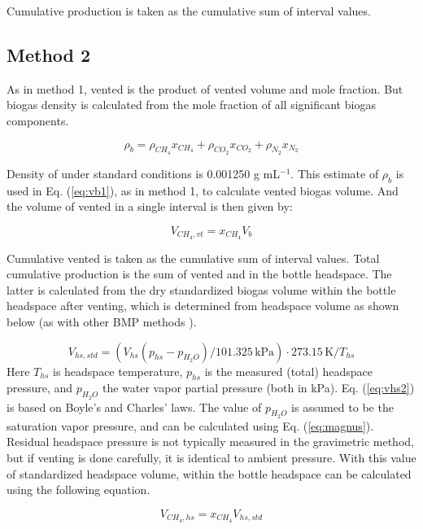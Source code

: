 \documentclass[]{article}
\newcommand{\unit}[1]{\ensuremath{\, \mathrm{#1}}}
\begin{document}
Cumulative production is taken as the cumulative sum of interval values. 

\subsection{Method 2}
As in method 1, vented  is the product of vented volume and  mole fraction.
But biogas density is calculated from the mole fraction of all significant biogas components.

\begin{equation}
  \label{eq:dens2}
  \rho_b = \rho_{CH_4} x_{CH_4} + \rho_{CO_2} x_{CO_2} + \rho_{N_2} x_{N_2}
\end{equation}

Density of  under standard conditions is 0.001250 g mL$^{-1}$.
This estimate of $\rho_b$ is used in Eq. (\ref{eq:vb1}), as in method 1, to calculate vented biogas volume.
And the volume of vented  in a single interval is then given by:

\begin{equation}
  \label{eq:vvch42}
  V_{CH_4,vt} = x_{CH_4} V_b
\end{equation}

Cumulative vented  is taken as the cumulative sum of interval values. 
Total cumulative  production is the sum of vented  and  in the bottle headspace.
The latter is calculated from the dry standardized biogas volume within the bottle headspace after venting, which is determined from headspace volume as shown below (as with other BMP methods \cite{bmpmethods}).

\begin{equation}
  \label{eq:vhs2}
  V_{hs,std} = ( V_{hs}(p_{hs} - p_{H_2O})/101.325 \unit{kPa} ) \cdot 273.15 \unit{K}/T_{hs}
\end{equation}
Here $T_{hs}$ is headspace temperature, $p_{hs}$ is the measured (total) headspace pressure, and $p_{H_2O}$ the water vapor partial pressure (both in kPa).
Eq. (\ref{eq:vhs2}) is based on Boyle's and Charles' laws.
The value of $p_{H_2O}$ is assumed to be the saturation vapor pressure, and can be calculated using Eq. (\ref{eq:magnus}).
Residual headspace pressure is not typically measured in the gravimetric method, but if venting is done carefully, it is identical to ambient pressure.
With this value of standardized headspace volume,  within the bottle headspace can be calculated using the following equation.

\begin{equation}
  \label{eq:vch4hs2}
  V_{CH_4,hs} = x_{CH_4} V_{hs,std}
\end{equation}
\end{document}
